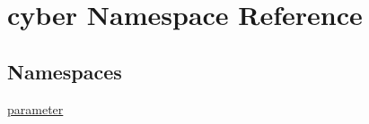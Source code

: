 \hypertarget{namespacecyber}{\section{cyber Namespace Reference}
\label{namespacecyber}
}
\subsection*{Namespaces}
\begin{DoxyCompactItemize}
\item 
\hyperlink{namespacecyber_1_1parameter}{parameter}
\end{DoxyCompactItemize}

